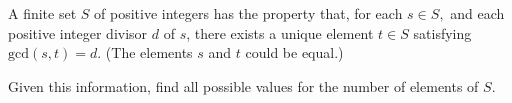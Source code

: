 A finite set $S$ of positive integers has the property that, for each $s \in S,$ and each positive integer divisor $d$ of $s$, there exists a unique element $t \in S$ satisfying $\text{gcd}(s, t) = d$. (The elements $s$ and $t$ could be equal.)

Given this information, find all possible values for the number of elements of $S$.
